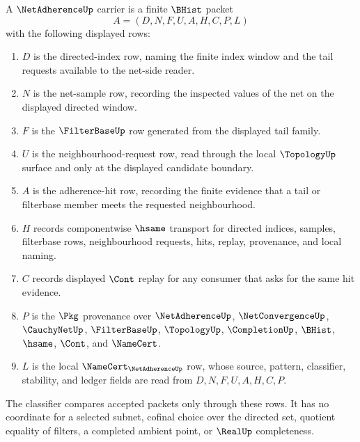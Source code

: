 \begin{definition}
\label{def:net-adherence-carrier}
A $\NetAdherenceUp$ carrier is a finite $\BHist$ packet
$$
A=(D,N,F,U,A,H,C,P,L)
$$
with the following displayed rows:
\begin{enumerate}
\item $D$ is the directed-index row, naming the finite index window and the tail requests available to the net-side reader.
\item $N$ is the net-sample row, recording the inspected values of the net on the displayed directed window.
\item $F$ is the $\FilterBaseUp$ row generated from the displayed tail family.
\item $U$ is the neighbourhood-request row, read through the local $\TopologyUp$ surface and only at the displayed candidate boundary.
\item $A$ is the adherence-hit row, recording the finite evidence that a tail or filterbase member meets the requested neighbourhood.
\item $H$ records componentwise $\hsame$ transport for directed indices, samples, filterbase rows, neighbourhood requests, hits, replay, provenance, and local naming.
\item $C$ records displayed $\Cont$ replay for any consumer that asks for the same hit evidence.
\item $P$ is the $\Pkg$ provenance over $\NetAdherenceUp$, $\NetConvergenceUp$, $\CauchyNetUp$, $\FilterBaseUp$, $\TopologyUp$, $\CompletionUp$, $\BHist$, $\hsame$, $\Cont$, and $\NameCert$.
\item $L$ is the local $\NameCert_{\NetAdherenceUp}$ row, whose source, pattern, classifier, stability, and ledger fields are read from $D,N,F,U,A,H,C,P$.
\end{enumerate}
The classifier compares accepted packets only through these rows. It has no coordinate for a selected subnet, cofinal choice over the directed set, quotient equality of filters, a completed ambient point, or $\RealUp$ completeness.
\end{definition}

